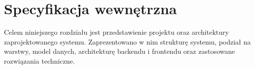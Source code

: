\documentclass[a4paper,twoside,12pt]{book}
\begin{document}
%
%
%
%
%        




\chapter{Specyfikacja wewnętrzna}
\label{ch:05}
Celem niniejszego rozdziału jest przedstawienie projektu oraz architektury 
zaprojektowanego systemu. Zaprezentowano w nim strukturę systemu, podział na warstwy, 
model danych, architekturę backendu i frontendu oraz zastosowane rozwiązania 
techniczne.


\end{document}
